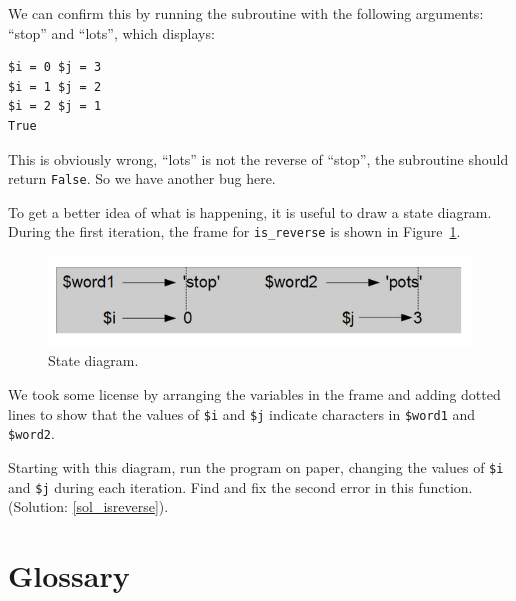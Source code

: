 We can confirm this by running the subroutine with the 
following arguments: ``stop'' and ``lots'', which displays:

\begin{verbatim}
$i = 0 $j = 3
$i = 1 $j = 2
$i = 2 $j = 1
True
\end{verbatim}
%

This is obviously wrong, ``lots'' is not the reverse of 
``stop'', the subroutine should return {\tt False}. So we 
have another bug here.

To get a better idea of what is
happening, it is useful to draw a state diagram.  During the first
iteration, the frame for \verb"is_reverse" is shown in
Figure~\ref{fig.state4}.   

\begin{figure}
\centerline
{\includegraphics[scale=0.5]{figs/state6.png}}
\caption{State diagram.}
\label{fig.state4}
\end{figure}

We took some license by arranging the variables in the frame
and adding dotted lines to show that the values of {\tt \$i} 
and {\tt \$j} indicate characters in {\tt \$word1} and 
{\tt \$word2}.

Starting with this diagram, run the program on paper, changing 
the values of {\tt \$i} and {\tt \$j} during each iteration. 
Find and fix the second error in this function.
(Solution: \ref{sol_isreverse}).
\label{isreverse}


\section{Glossary}

